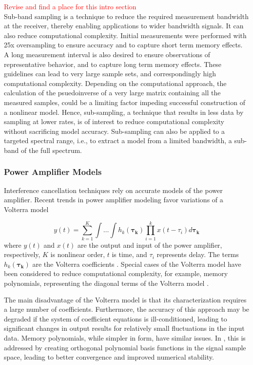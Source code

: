 \documentclass[11pt,onecolumn]{IEEEtran}
\begin{document}
\textcolor{red}{Revise and find a place for this intro section}\\Sub-band sampling is a technique to reduce the required measurement bandwidth at the receiver, thereby enabling applications to wider bandwidth signals.  It can also reduce computational complexity.   Initial measurements were performed with 25x oversampling to ensure accuracy and to capture short term memory effects.  A long measurement interval is also desired to ensure observations of representative behavior, and to capture long term memory effects.  These guidelines can lead to very large sample sets, and correspondingly high computational complexity.  Depending on the computational approach, the calculation of the psuedoinverse of a very large matrix containing all the measured samples, could be a limiting factor impeding successful construction of a nonlinear model.  Hence, sub-sampling, a technique that results in less data by sampling at lower rates, is of interest to reduce computational complexity without sacrificing model accuracy.  Sub-sampling can also be applied to a targeted spectral range, i.e., to extract a model from a limited bandwidth, a sub-band of the full spectrum.

\subsubsection{Power Amplifier Models}
Interference cancellation techniques rely on accurate models of the power amplifier.  Recent trends in power amplifier modeling  \cite{ZhuSimpl, Ding, Raich, Zhuprune} favor variations of a Volterra model \par

\begin{equation}\label{eq1}
y(t) = \sum_{k=1}^K\int\dots\int h_k( \boldsymbol{\tau_k})\prod_{i=1}^kx(t-\tau_i)d \boldsymbol{\tau_k}
\end{equation}
where $y(t)$ and $x(t)$ are the output and input of the power amplifier, respectively, $K$ is nonlinear order, $t$ is time, and $\tau_i$ represents delay.  
The terms $h_k(\boldsymbol{\tau_k})$ are the Volterra coefficients \cite{Zhuprune}.  Special cases of the Volterra model have been considered to reduce computational complexity, for example,  memory polynomials, representing the diagonal terms of the Volterra model \cite{Ding}.  \par
The main disadvantage of the Volterra model is that its characterization requires a large number of coefficients.  Furthermore, the accuracy of this approach may be degraded if the system of coefficient equations is ill-conditioned, leading to significant changes in output results for relatively small fluctuations in the input data.  Memory polynomials, while simpler in form, have similar issues.  In \cite{Raich}, this is addressed by creating orthogonal polynomial basis functions in the signal sample space, leading to better convergence and improved numerical stability. 
\end{document}
